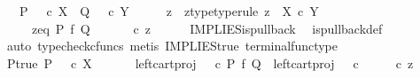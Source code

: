 \begin{isabellebody}
\ \ \ {\isachardoublequoteopen}P\ {\isacharequal}{\kern0pt}\ {\isasymt}\ {\isasymcirc}\isactrlsub c\ {\isasymbeta}\isactrlbsub X\isactrlesub \ {\isasymLongrightarrow}\ Q\ {\isacharequal}{\kern0pt}\ {\isasymt}\ {\isasymcirc}\isactrlsub c\ {\isasymbeta}\isactrlbsub Y\isactrlesub {\isachardoublequoteclose}\isanewline
%
\isadelimproof
%
\endisadelimproof
%
\isatagproof
{}\isamarkupfalse%
\ {\isacharminus}{\kern0pt}\isanewline
\ \ \isamarkupfalse%
\ z\ \ z{\isacharunderscore}{\kern0pt}type{\isacharbrackleft}{\kern0pt}type{\isacharunderscore}{\kern0pt}rule{\isacharbrackright}{\kern0pt}{\isacharcolon}{\kern0pt}\ {\isachardoublequoteopen}z\ {\isacharcolon}{\kern0pt}\ X\ {\isasymtimes}\isactrlsub c\ Y\ {\isasymrightarrow}\ {\isasymone}\ {\isasymCoprod}\ {\isasymone}\ {\isasymCoprod}\ {\isasymone}{\isachardoublequoteclose}\isanewline
\ \ \ \ \ z{\isacharunderscore}{\kern0pt}eq{\isacharcolon}{\kern0pt}\ {\isachardoublequoteopen}P\ {\isasymtimes}\isactrlsub f\ Q\ {\isacharequal}{\kern0pt}\ {\isacharparenleft}{\kern0pt}{\isasymlangle}{\isasymt}{\isacharcomma}{\kern0pt}{\isasymt}{\isasymrangle}\ {\isasymamalg}\ {\isasymlangle}{\isasymf}{\isacharcomma}{\kern0pt}{\isasymf}{\isasymrangle}\ {\isasymamalg}\ {\isasymlangle}{\isasymf}{\isacharcomma}{\kern0pt}{\isasymt}{\isasymrangle}{\isacharparenright}{\kern0pt}\ {\isasymcirc}\isactrlsub c\ z{\isachardoublequoteclose}\isanewline
\ \ \ \ \isamarkupfalse%
\ IMPLIES{\isacharunderscore}{\kern0pt}is{\isacharunderscore}{\kern0pt}pullback\ \isamarkupfalse%
\ is{\isacharunderscore}{\kern0pt}pullback{\isacharunderscore}{\kern0pt}def\isanewline
\ \ \ \ \isamarkupfalse%
\ {\isacharparenleft}{\kern0pt}auto{\isacharcomma}{\kern0pt}\ typecheck{\isacharunderscore}{\kern0pt}cfuncs{\isacharcomma}{\kern0pt}\ metis\ IMPLIES{\isacharunderscore}{\kern0pt}true\ terminal{\isacharunderscore}{\kern0pt}func{\isacharunderscore}{\kern0pt}type{\isacharparenright}{\kern0pt}\ \ \isanewline
\ \ \isamarkupfalse%
\ P{\isacharunderscore}{\kern0pt}true{\isacharcolon}{\kern0pt}\ {\isachardoublequoteopen}P\ {\isacharequal}{\kern0pt}\ {\isasymt}\ {\isasymcirc}\isactrlsub c\ {\isasymbeta}\isactrlbsub X\isactrlesub {\isachardoublequoteclose}\isanewline
\ \ \isanewline
\ \ \isamarkupfalse%
\ {\isachardoublequoteopen}left{\isacharunderscore}{\kern0pt}cart{\isacharunderscore}{\kern0pt}proj\ {\isasymOmega}\ {\isasymOmega}\ {\isasymcirc}\isactrlsub c\ {\isacharparenleft}{\kern0pt}P\ {\isasymtimes}\isactrlsub f\ Q{\isacharparenright}{\kern0pt}\ {\isacharequal}{\kern0pt}\ left{\isacharunderscore}{\kern0pt}cart{\isacharunderscore}{\kern0pt}proj\ {\isasymOmega}\ {\isasymOmega}\ {\isasymcirc}\isactrlsub c\ {\isacharparenleft}{\kern0pt}{\isasymlangle}{\isasymt}{\isacharcomma}{\kern0pt}{\isasymt}{\isasymrangle}\ {\isasymamalg}\ {\isasymlangle}{\isasymf}{\isacharcomma}{\kern0pt}{\isasymf}{\isasymrangle}\ {\isasymamalg}\ {\isasymlangle}{\isasymf}{\isacharcomma}{\kern0pt}{\isasymt}{\isasymrangle}{\isacharparenright}{\kern0pt}\ {\isasymcirc}\isactrlsub c\ z{\isachardoublequoteclose}\isanewline

\end{isabellebody}

